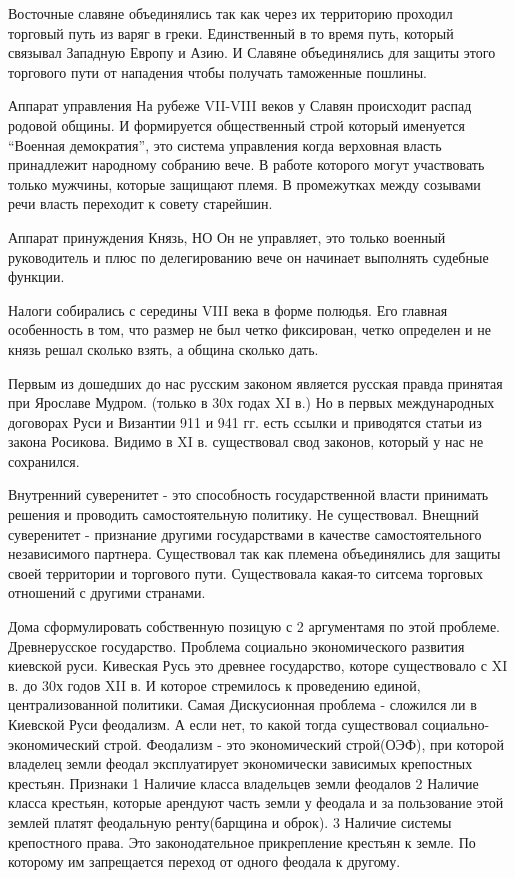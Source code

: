 \documentclass[a4paper]{article}
\begin{document}
Восточные славяне объединялись так как через их территорию проходил торговый путь из варяг в греки. Единственный в то время путь, который связывал Западную Европу и Азию. И Славяне объединялись для защиты этого торгового пути от нападения чтобы получать таможенные пошлины.

Аппарат управления
На рубеже VII-VIII веков у Славян происходит распад родовой общины. И формируется общественный строй который именуется ``Военная демократия'', это система управления когда верховная власть принадлежит народному собранию вече. В работе которого могут участвовать только мужчины, которые защищают племя. В промежутках между созывами речи власть переходит к совету старейшин.

Аппарат принуждения
Князь, НО Он не управляет, это только военный руководитель и плюс по делегированию вече он начинает выполнять судебные функции.

Налоги собирались с середины VIII века в форме полюдья. Его главная особенность в том, что размер не был четко фиксирован, четко определен и не князь решал сколько взять, а община сколько дать.

Первым из дошедших до нас русским законом является русская правда принятая при Ярославе Мудром. (только в 30х годах XI в.) Но в первых международных договорах Руси и Византии 911 и 941 гг. есть ссылки и приводятся статьи из закона Росикова. Видимо в XI в. существовал свод законов, который у нас не сохранился.

Внутренний суверенитет - это способность государственной власти принимать решения и проводить самостоятельную политику. Не существовал.
Внещний суверенитет - признание другими государствами в качестве самостоятельного независимого партнера.
Существовал так как племена объединялись для защиты своей территории и торгового пути. Существовала какая-то ситсема торговых отношений с другими странами.

Дома сформулировать собственную позицую с 2 аргументамя по этой проблеме.
Древнерусское государство. Проблема социально экономического развития киевской руси.
Кивеская Русь это древнее государство, которе существовало с XI в. до 30х годов XII в. И которое стремилось к проведению единой, централизованной политики. Самая Дискусионная проблема - сложился ли в Киевской Руси феодализм. А если нет, то какой тогда существовал социально-экономический строй.
Феодализм - это экономический строй(ОЭФ), при которой владелец земли феодал эксплуатирует экономически зависимых крепостных крестьян.
Признаки 
1   Наличие класса владельцев земли феодалов
2   Наличие класса крестьян, которые арендуют часть земли у феодала и за пользование этой землей платят феодальную ренту(барщина и оброк).
3   Наличие системы крепостного права. Это законодательное прикрепление крестьян к земле. По которому им запрещается переход от одного феодала к другому.
\end{document}
